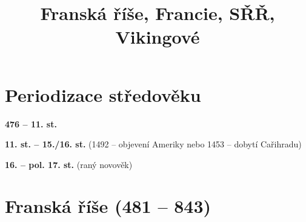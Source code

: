 \documentclass{article}
\title{\vspace{-2cm}Franská říše, Francie, SŘŘ, Vikingové\vspace{-1.7cm}}
\date{}
\author{}
\begin{document}
\maketitle

\section*{Periodizace středověku}
\begin{description}
    \vspace{-0.5em}
    \setlength\itemsep{0.15em}
    \item[raný] \textbf{476 -- 11. st.}
    \item[vrcholný] \textbf{11. st. -- 15./16. st.} (1492 -- objevení Ameriky nebo 1453 -- dobytí Cařihradu)
    \item[pozdní] \textbf{16. -- pol. 17. st.} (raný novověk)
\end{description}

\section*{Franská říše (481 -- 843)}
\end{document}
